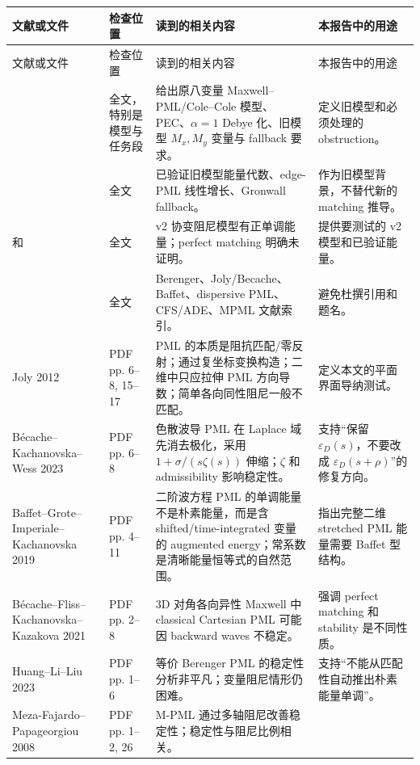\documentclass[UTF8,a4paper,11pt]{ctexart}
\newcommand{\eps}{\varepsilon}
\begin{document}
\begin{center}
\scriptsize
{\setlength{\tabcolsep}{3pt}
\begin{longtable}{@{}L{0.20\textwidth}L{0.14\textwidth}L{0.31\textwidth}L{0.23\textwidth}@{}}
\toprule
文献或文件 & 检查位置 & 读到的相关内容 & 本报告中的用途 \\
\midrule
\endfirsthead
\toprule
文献或文件 & 检查位置 & 读到的相关内容 & 本报告中的用途 \\
\midrule
\endhead
{}
& 全文，特别是模型与任务段
& 给出原八变量 Maxwell--PML/Cole--Cole 模型、PEC、\(\alpha=1\) Debye 化、旧模型 \(M_x,M_y\) 变量与 fallback 要求。
& 定义旧模型和必须处理的 obstruction。\\
& 全文
& 已验证旧模型能量代数、edge-PML 线性增长、Gronwall fallback。
& 作为旧模型背景，不替代新的 matching 推导。\\
 和 
& 全文
& v2 协变阻尼模型有正单调能量；perfect matching 明确未证明。
& 提供要测试的 v2 模型和已验证能量。\\
& 全文
& Berenger、Joly/Becache、Baffet、dispersive PML、CFS/ADE、MPML 文献索引。
& 避免杜撰引用和题名。\\
Joly 2012
& PDF pp. 6--8, 15--17
& PML 的本质是阻抗匹配/零反射；通过复坐标变换构造；二维中只应拉伸 PML 方向导数；简单各向同性阻尼一般不匹配。
& 定义本文的平面界面导纳测试。\\
Bécache--Kachanovska--Wess 2023
& PDF pp. 6--8
& 色散波导 PML 在 Laplace 域先消去极化，采用 \(1+\sigma/(s\zeta(s))\) 伸缩；\(\zeta\) 和 admissibility 影响稳定性。
& 支持“保留 \(\eps_D(s)\)，不要改成 \(\eps_D(s+\rho)\)”的修复方向。\\
Baffet--Grote--Imperiale--Kachanovska 2019
& PDF pp. 4--11
& 二阶波方程 PML 的单调能量不是朴素能量，而是含 shifted/time-integrated 变量的 augmented energy；常系数是清晰能量恒等式的自然范围。
& 指出完整二维 stretched PML 能量需要 Baffet 型结构。\\
Bécache--Fliss--Kachanovska--Kazakova 2021
& PDF pp. 2--8
& 3D 对角各向异性 Maxwell 中 classical Cartesian PML 可能因 backward waves 不稳定。
& 强调 perfect matching 和 stability 是不同性质。\\
Huang--Li--Liu 2023
& PDF pp. 1--6
& 等价 Berenger PML 的稳定性分析非平凡；变量阻尼情形仍困难。
& 支持“不能从匹配性自动推出朴素能量单调”。\\
Meza-Fajardo--Papageorgiou 2008
& PDF pp. 1--2, 26
& M-PML 通过多轴阻尼改善稳定性；稳定性与阻尼比例相关。

\end{longtable}}
\end{center}
\end{document}
